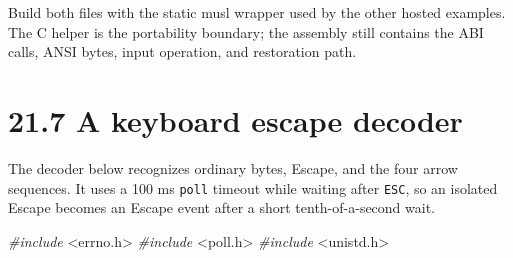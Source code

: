 \documentclass[
  oneside,
  openany]{book}
\newenvironment{Shaded}{\begin{snugshade}}{\end{snugshade}}
\newcommand{\ImportTok}[1]{#1}
\newcommand{\PreprocessorTok}[1]{\textcolor[rgb]{0.56,0.35,0.01}{\textit{#1}}}
\begin{document}
Build both files with the static musl wrapper used by the other hosted
examples. The C helper is the portability boundary; the assembly still
contains the ABI calls, ANSI bytes, input operation, and restoration
path.

\hypertarget{a-keyboard-escape-decoder}{%
\section{21.7 A keyboard escape
decoder}\label{a-keyboard-escape-decoder}}

The decoder below recognizes ordinary bytes, Escape, and the four arrow
sequences. It uses a 100 ms \texttt{poll} timeout while waiting after
\texttt{ESC}, so an isolated Escape becomes an Escape event after a
short tenth-of-a-second wait.

\begin{Shaded}
\begin{Highlighting}[]
\PreprocessorTok{\#include }\ImportTok{\textless{}errno.h\textgreater{}}
\PreprocessorTok{\#include }\ImportTok{\textless{}poll.h\textgreater{}}
\PreprocessorTok{\#include }\ImportTok{\textless{}unistd.h\textgreater{}}


\end{Highlighting}
\end{Shaded}
\end{document}
